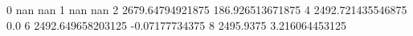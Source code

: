 0 nan nan
1 nan nan
2 2679.64794921875 186.926513671875
4 2492.721435546875 0.0
6 2492.649658203125 -0.07177734375
8 2495.9375 3.216064453125
